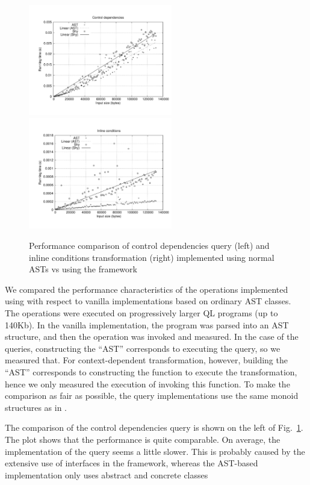 \begin{figure}[t]
  \hspace*{-.1\textwidth}
  \includegraphics[width=0.56\textwidth]{plots/controldeps}
  \includegraphics[width=0.56\textwidth]{plots/inline}
  \caption{Performance comparison of control dependencies query (left) and inline conditions transformation (right) implemented using normal ASTs vs using the \name framework\label{FIG:performance}}
\end{figure}

We compared the performance characteristics of the operations implemented using \name with respect to vanilla implementations based on ordinary AST classes.
The operations were executed on progressively larger QL programs (up to 140Kb).
In the vanilla implementation, the program was parsed into an AST structure, and then the operation was invoked and measured.
In the case of the \name queries, constructing the ``AST'' corresponds to executing the query, so we measured that.
For context-dependent transformation, however, building the ``AST'' corresponds to constructing the function to execute the transformation, hence we only measured the execution of invoking this function. 
To make the comparison as fair as possible, the query implementations use the same monoid structures as in \name.

The comparison of the control dependencies query is shown on the left of Fig.~\ref{FIG:performance}.
The plot shows that the performance is quite comparable.
On average, the \name implementation of the query seems a little slower.
This is probably caused by the extensive use of interfaces in the \name framework, whereas the AST-based implementation only uses abstract and concrete classes

